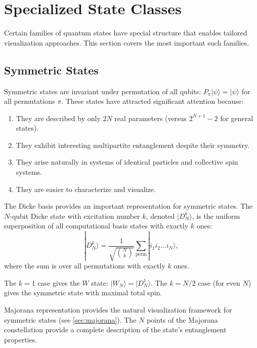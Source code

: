 \documentclass[%
 amsmath,amssymb,
 aps,
rmp,
]{revtex4-2}
\begin{document}






\section{Specialized State Classes}
\label{sec:specialized}

Certain families of quantum states have special structure that enables tailored visualization approaches. This section covers the most important such families.

\subsection{Symmetric States}
\label{sec:symmetric}

Symmetric states are invariant under permutation of all qubits: $P_\pi |\psi\rangle = |\psi\rangle$ for all permutations $\pi$. These states have attracted significant attention because:
\begin{enumerate}
	\item They are described by only $2N$ real parameters (versus $2^{N+1} - 2$ for general states).
	\item They exhibit interesting multipartite entanglement despite their symmetry.
	\item They arise naturally in systems of identical particles and collective spin systems.
	\item They are easier to characterize and visualize.
\end{enumerate}

The Dicke basis provides an important representation for symmetric states. The $N$-qubit Dicke state with excitation number $k$, denoted $|D_N^k\rangle$, is the uniform superposition of all computational basis states with exactly $k$ ones:
\label{sec:dicke}
\begin{equation}
	|D_N^k\rangle = \frac{1}{\sqrt{\binom{N}{k}}} \sum_{\text{perm}} |i_1 i_2 \ldots i_N\rangle,
\end{equation}
where the sum is over all permutations with exactly $k$ ones.

The $k=1$ case gives the $W$ state: $|W_N\rangle = |D_N^1\rangle$. The $k=N/2$ case (for even $N$) gives the symmetric state with maximal total spin.

Majorana representation provides the natural visualization framework for symmetric states (see \cref{sec:majorana}). The $N$ points of the Majorana constellation provide a complete description of the state's entanglement properties.
\end{document}
